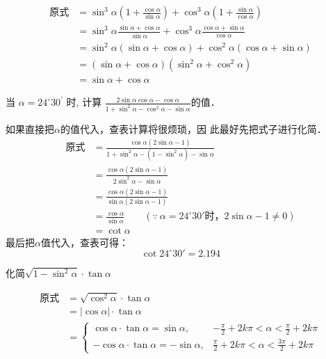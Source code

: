 \begin{solution}
\[\begin{split}
\text{原式}
    &=\sin ^{3} \alpha\left(1+\frac{\cos \alpha}{\sin \alpha}\right)+\cos ^{3} \alpha\left(1+\frac{\sin \alpha}{\cos \alpha}\right) \\
    &=\sin ^{3} \alpha \frac{\sin \alpha+\cos \alpha}{\sin \alpha}+\cos ^{3} \alpha \frac{\cos \alpha+\sin \alpha}{\cos \alpha} \\
    &=\sin ^{2} \alpha(\sin \alpha+\cos \alpha)+\cos ^{2} \alpha(\cos \alpha+\sin \alpha) \\
    &=(\sin \alpha+\cos \alpha)\left(\sin ^{2} \alpha+\cos ^{2} \alpha\right) \\
    &=\sin \alpha+\cos \alpha
\end{split}\]
\end{solution}

\begin{example}
    当 $\alpha=24^{\circ} 30^{\prime}$ 时, 计算
$
\frac{2 \sin \alpha \cos \alpha-\cos \alpha}{1+\sin ^{2} \alpha-\cos ^{2} \alpha-\sin \alpha}
$的值．
\end{example}

\begin{solution}
    如果直接把$\alpha$的值代入，查表计算将很烦琐，因
此最好先把式子进行化简．
\[\begin{split}
\text{原式}&=\frac{\cos\alpha(2\sin\alpha-1)}{1+\sin^2\alpha-(1-\sin^2\alpha)-\sin\alpha}\\
&=\frac{\cos\alpha(2\sin\alpha-1)}{2\sin^2\alpha-\sin\alpha}\\
&=\frac{\cos\alpha(2\sin\alpha-1)}{\sin\alpha(2\sin\alpha-1)}\\
&=\frac{\cos\alpha}{\sin\alpha}\qquad (\because\ \alpha=24^{\circ}30'\text{时，}2\sin\alpha-1\ne 0)\\
&=\cot\alpha
\end{split}\]
最后把$\alpha$值代入，查表可得：
\[\cot24^{\circ}30'=2.194\]
\end{solution}


\begin{example}
    化简$\sqrt{1-\sin^2\alpha}\cdot \tan\alpha$
\end{example}

\begin{solution}
\[\begin{split}
    \text{原式}&=\sqrt{\cos^2\alpha}\cdot \tan\alpha\\
    &=|\cos\alpha|\cdot \tan\alpha\\
    &=\begin{cases}
   \cos\alpha\cdot \tan\alpha=\sin\alpha, & -\frac{\pi}{2}+2k\pi<\alpha<\frac{\pi}{2}+2k\pi\\
   -\cos\alpha\cdot \tan\alpha=-\sin\alpha, & \frac{\pi}{2}+2k\pi<\alpha<\frac{3\pi}{2}+2k\pi
    \end{cases}
\end{split}\]
\end{solution}

